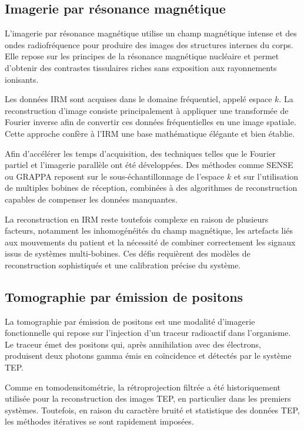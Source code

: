 \subsection{Imagerie par résonance magnétique}
L'imagerie par résonance magnétique utilise un champ magnétique intense et des ondes radiofréquence pour produire des images des structures internes du corps. Elle repose sur les principes de la résonance magnétique nucléaire et permet d'obtenir des contrastes tissulaires riches sans exposition aux rayonnements ionisants.

Les données IRM sont acquises dans le domaine fréquentiel, appelé espace \(k\). La reconstruction d'image consiste principalement à appliquer une transformée de Fourier inverse afin de convertir ces données fréquentielles en une image spatiale. Cette approche confère à l'IRM une base mathématique élégante et bien établie.

Afin d'accélérer les temps d'acquisition, des techniques telles que le Fourier partiel et l'imagerie parallèle ont été développées. Des méthodes comme SENSE ou GRAPPA reposent sur le sous-échantillonnage de l'espace \(k\) et sur l'utilisation de multiples bobines de réception, combinées à des algorithmes de reconstruction capables de compenser les données manquantes.

La reconstruction en IRM reste toutefois complexe en raison de plusieurs facteurs, notamment les inhomogénéités du champ magnétique, les artefacts liés aux mouvements du patient et la nécessité de combiner correctement les signaux issus de systèmes multi-bobines. Ces défis requièrent des modèles de reconstruction sophistiqués et une calibration précise du système.

\subsection{Tomographie par émission de positons}

La tomographie par émission de positons est une modalité d'imagerie fonctionnelle qui repose sur l'injection d'un traceur radioactif dans l'organisme. Le traceur émet des positons qui, après annihilation avec des électrons, produisent deux photons gamma émis en coïncidence et détectés par le système TEP.

Comme en tomodensitométrie, la rétroprojection filtrée a été historiquement utilisée pour la reconstruction des images TEP, en particulier dans les premiers systèmes. Toutefois, en raison du caractère bruité et statistique des données TEP, les méthodes itératives se sont rapidement imposées.

